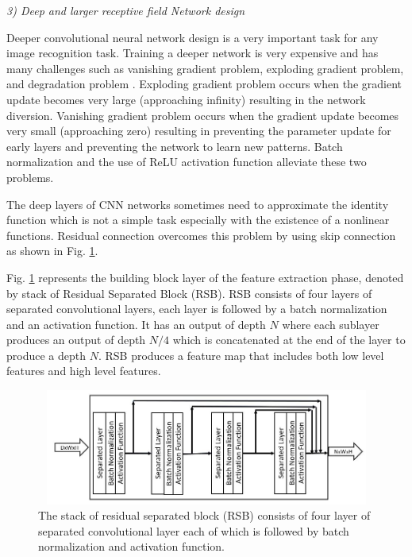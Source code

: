 \textit{3) Deep and larger receptive field Network design}

Deeper convolutional neural network design is a very important task for any image recognition task\cite{resnet}. Training a deeper network is very expensive and has many challenges such as vanishing gradient problem, exploding gradient problem, and degradation problem \cite{resnet}. Exploding gradient problem occurs  when the  gradient update becomes very large (approaching infinity) resulting in the network diversion. Vanishing gradient problem occurs when the  gradient update becomes very small (approaching zero) resulting in preventing the parameter update for early layers\cite{resnet} and preventing the network to learn new patterns. Batch normalization \cite{batchnorm} and the use of ReLU activation function \cite{alexnet} alleviate these two problems.

The deep layers of CNN networks sometimes need to  approximate the identity function which is not a simple task especially  with the existence of a nonlinear functions. Residual connection\cite{resnet} overcomes this problem by using skip connection as shown in Fig. \ref{fig4}.


Fig. \ref{fig4} represents the building block layer of the feature extraction phase, denoted by stack of Residual Separated Block  (RSB). RSB consists of four layers of separated convolutional layers, each layer is followed by a batch normalization and an activation function. It has an output of depth $N$ where each sublayer produces an output of depth $N/4$ which is concatenated at the end of the layer to produce a depth  $N$. RSB produces a feature map that includes both low level features and high level features.

\begin{figure}
\begin{center}
\includegraphics[height=38mm,width=14.0cm]{Figures/fig4.jpg}
\caption{The stack of residual separated block  (RSB) consists of four layer of separated convolutional layer each of which is followed by batch normalization and activation function.}
\end{center}
\label{fig4}
\end{figure}

